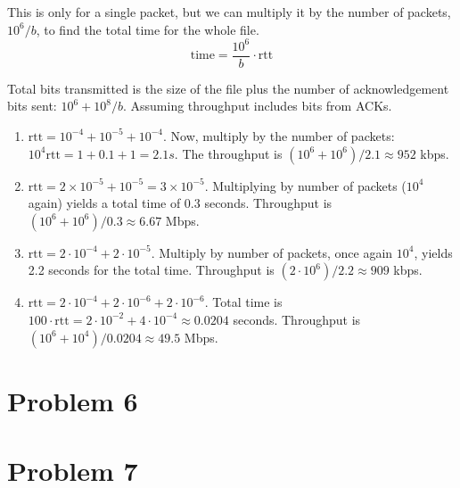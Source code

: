 \documentclass{article}
\begin{document}
This is only for a single packet, but we can multiply it by the number of
packets, $10^6 / b$, to find the total time for the whole file.
\begin{equation*}
  \text{time} = \frac{10^6}{b} \cdot \text{rtt}
\end{equation*}

Total bits transmitted is the size of the file plus the number of
acknowledgement bits sent: $10^6 + 10^8/b$. Assuming throughput includes bits
from ACKs.

\begin{enumerate}[label={\bf (\alph*)}]

  \item $\text{rtt} = 10^{-4} + 10^{-5} + 10^{-4}$.
    Now, multiply by the number of packets: $10^4 \text{rtt} = 1 + 0.1 +
    1 = 2.1 s$. The throughput is $(10^6 + 10^6) / 2.1 \approx 952$ kbps.
  \item $\text{rtt} = 2\times 10^{-5} + 10^{-5} = 3\times 10^{-5}$. Multiplying
    by number of packets ($10^4$ again) yields a total time of 0.3 seconds.
    Throughput is $(10^6 + 10^6) / 0.3 \approx 6.67$ Mbps.
  \item $\text{rtt} = 2\cdot 10^{-4} + 2\cdot 10^{-5}$. Multiply by number of
    packets, once again $10^4$, yields 2.2 seconds for the total time.
    Throughput is $(2\cdot10^6)/2.2 \approx 909$ kbps.
  \item $\text{rtt} = 2\cdot10^{-4} + 2\cdot 10^{-6} + 2\cdot 10^{-6}$. Total
    time is $100\cdot \text{rtt} = 2\cdot10^{-2} + 4\cdot10^{-4} \approx 0.0204$
    seconds. Throughput is $(10^6 + 10^4)/0.0204 \approx 49.5$ Mbps.

\end{enumerate}

\section*{Problem 6}



\section*{Problem 7}
\end{document}
